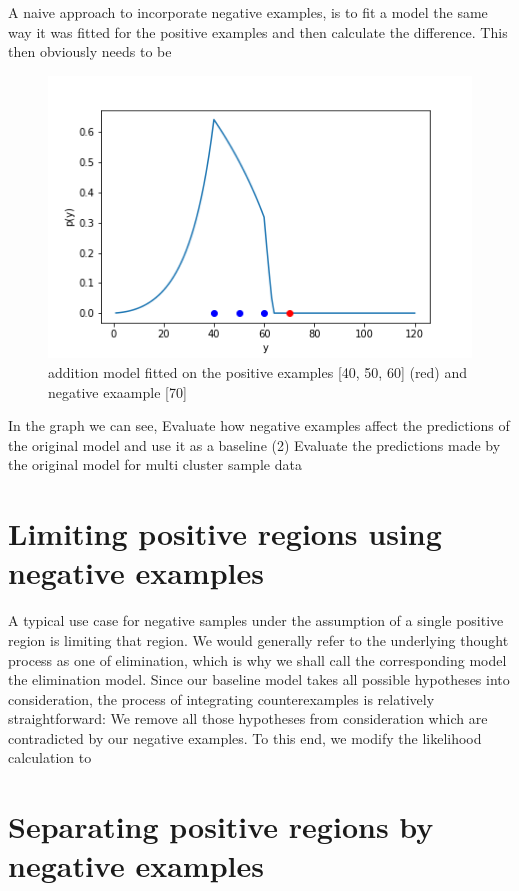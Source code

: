 \documentclass[12pt, ]{scrartcl}
\begin{document}
\begin{multicols}{2}
A naive approach to incorporate negative examples, is to fit a model the same way it was fitted for the positive examples and then calculate the difference.
This then obviously needs to be 

\begin{figure}
	\centering
	\includegraphics{graphics/addition_model}
	\caption{addition model fitted on the positive examples [40, 50, 60] (red) and negative exaample [70]}
\end{figure}
\noindent
In the graph we can see,
Evaluate how negative examples affect the predictions of the original model and use it as a baseline
(2) Evaluate the predictions made by the original model for multi cluster sample data
	
	
\section{Limiting positive regions using negative examples}
A typical use case for negative samples under the assumption of a single positive region is limiting that region.
We would generally refer to the underlying thought process as one of elimination, which is why we shall call the corresponding model the elimination model.
Since our baseline model takes all possible hypotheses into consideration, the process of integrating counterexamples is relatively straightforward: We remove all those hypotheses from consideration which are contradicted by our negative examples.
To this end, we modify the likelihood calculation to

\section{Separating positive regions by negative examples}



\end{multicols}
\end{document}
